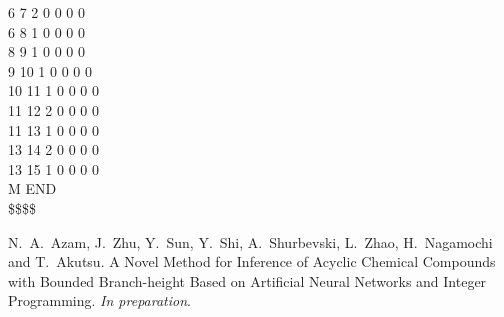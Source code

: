 \documentclass[11pt,titlepage,dvipdfmx,twoside]{article}
\begin{document}
\begin{oframed}
{  6  7  2  0  0  0  0\\
  6  8  1  0  0  0  0\\
  8  9  1  0  0  0  0\\
  9 10  1  0  0  0  0\\
 10 11  1  0  0  0  0\\
 11 12  2  0  0  0  0\\
 11 13  1  0  0  0  0\\
 13 14  2  0  0  0  0\\
 13 15  1  0  0  0  0\\
M  END\\
\$\$\$\$\\}
\end{oframed}

\newpage
{} 
\begin{thebibliography}{10}
		N.~A.~Azam, J.~Zhu, Y.~Sun, Y.~Shi, A.~Shurbevski, L.~Zhao, H.~Nagamochi and T.~Akutsu.
		A Novel Method for Inference of Acyclic Chemical Compounds with Bounded Branch-height Based on Artificial Neural Networks and Integer Programming. {\em In preparation}.
\end{thebibliography}
\end{document}
